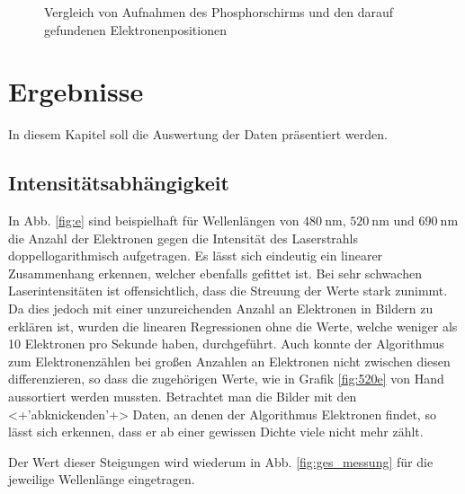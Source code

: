 \documentclass[bachelor,       %
               twoside,        %
               BCOR10mm,       %
               english,ngerman, %
               ]{GAUBM}
\begin{document}
\begin{figure}[h!]
  \caption{Vergleich von Aufnahmen des Phosphorschirms und den darauf gefundenen Elektronenpositionen}
  \label{fig:algorithmus}
\end{figure}



\chapter{Ergebnisse}
In diesem Kapitel soll die Auswertung der Daten präsentiert werden.

\section{Intensitätsabhängigkeit}
In Abb. \ref{fig:e} sind beispielhaft für Wellenlängen von $\SI{480}{\nano\meter}$, $\SI{520}{\nano\meter}$ und $\SI{690}{\nano\meter}$ die Anzahl der Elektronen gegen die Intensität des Laserstrahls doppellogarithmisch aufgetragen.
Es lässt sich eindeutig ein linearer Zusammenhang erkennen, welcher ebenfalls gefittet ist.
Bei sehr schwachen Laserintensitäten ist offensichtlich, dass die Streuung der Werte stark zunimmt.
Da dies jedoch mit einer unzureichenden Anzahl an Elektronen in Bildern zu erklären ist, wurden die linearen Regressionen ohne die Werte, welche weniger als 10 Elektronen pro Sekunde haben, durchgeführt.
Auch konnte der Algorithmus zum Elektronenzählen bei großen Anzahlen an Elektronen nicht zwischen diesen differenzieren, so dass die zugehörigen Werte, wie in Grafik \ref{fig:520e} von Hand aussortiert werden mussten.
Betrachtet man die Bilder mit den <+'abknickenden'+> Daten, an denen der Algorithmus Elektronen findet, so lässt sich erkennen, dass er ab einer gewissen Dichte viele nicht mehr zählt.


Der Wert dieser Steigungen wird wiederum in Abb. \ref{fig:ges_messung} für die jeweilige Wellenlänge eingetragen.\newline\newline
\end{document}
